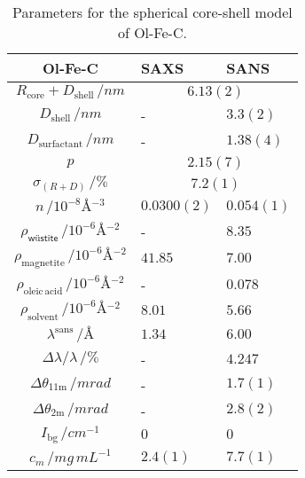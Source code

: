 \documentclass[\main/dresen_thesis.tex]{subfiles}
\begin{document}
  \begin{table}[!htbp]
    \centering
    \caption{\label{tab:colloidalCrystals:nanoparticle:sas}Parameters for the spherical core-shell model of Ol-Fe-C.}
    \begin{tabular}{ c | l | l}
      \rule{0pt}{2ex} \textbf{Ol-Fe-C} & \textbf{SAXS} & \textbf{SANS}\\
      \hline
      \rule{0pt}{2ex} $R_\mathrm{core} + D_\mathrm{shell} \, / \unit{nm}$             & \multicolumn{2}{c}{$6.13(2)$} \\
      \rule{0pt}{2ex} $D_\mathrm{shell}\, / \unit{nm}$                                & -            & $3.3(2)$       \\
      \rule{0pt}{2ex} $D_\mathrm{surfactant}\, / \unit{nm}$                           & -            & $1.38(4)$    \\
      \rule{0pt}{2ex} $p $                                                            & \multicolumn{2}{c}{$2.15(7)$} \\
      \rule{0pt}{2ex} $\sigma_{(R+D)}\, / \unit{\%}$                                  & \multicolumn{2}{c}{$7.2(1)$} \\
      \rule{0pt}{2ex} $n \, / \unit{10^{-8} \angstrom^{-3}}$                          & $0.0300(2)$  &  $0.054(1)$ \\
      \hline
      \rule{0pt}{2ex} $\rho_\textsf{w\"ustite} \, / \unit{10^{-6} \angstrom^{-2}}$    & -       & $8.35$\\
      \rule{0pt}{2ex} $\rho_\mathrm{magnetite} \, / \unit{10^{-6} \angstrom^{-2}}$    & $41.85$ & $7.00$\\
      \rule{0pt}{2ex} $\rho_\mathrm{oleic\, acid} \, / \unit{10^{-6} \angstrom^{-2}}$ & -       & $0.078$\\
      \rule{0pt}{2ex} $\rho_\mathrm{solvent} \, / \unit{10^{-6} \angstrom^{-2}}$      & $8.01$  & $5.66$\\
      \hline
      \rule{0pt}{2ex} $\lambda^\mathrm{sans} \, / \unit{\unit{\angstrom}}$            & $1.34$  & $6.00$\\
      \rule{0pt}{2ex} $\Delta \lambda / \lambda \, / \unit{\%}$                       & -       & $4.247$\\
      \rule{0pt}{2ex} $\Delta \theta_\mathrm{11 m} \, / \unit{mrad}$                  & -       & $1.7(1)$\\
      \rule{0pt}{2ex} $\Delta \theta_\mathrm{2 m} \, / \unit{mrad}$                   & -       & $2.8(2)$\\
      \rule{0pt}{2ex} $I_\mathrm{bg} \, / \unit{cm^{-1}}$                             & $0$     & $0$\\
      \hline
      \rule{0pt}{2ex} $c_m \, / \unit{mg\, mL^{-1}}$                                  & $2.4(1)$ & $7.7(1)$\\
      \hline
    \end{tabular}
  \end{table}
\end{document}
